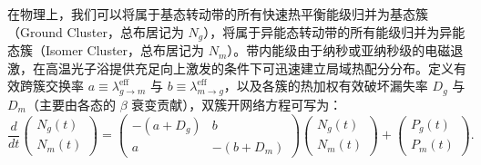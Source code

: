 在物理上，我们可以将属于基态转动带的所有快速热平衡能级归并为基态簇（Ground Cluster，总布居记为 $N_g$），将属于异能态转动带的所有能级归并为异能态簇（Isomer Cluster，总布居记为 $N_m$）。带内能级由于纳秒或亚纳秒级的电磁退激，在高温光子浴提供充足向上激发的条件下可迅速建立局域热配分分布。定义有效跨簇交换率 $a \equiv \lambda_{g \to m}^{\mathrm{eff}}$ 与 $b \equiv \lambda_{m \to g}^{\mathrm{eff}}$，以及各簇的热加权有效破坏漏失率 $D_g$ 与 $D_m$（主要由各态的 $\beta$ 衰变贡献），双簇开网络方程可写为：
\begin{equation}\label{eq:4-8-two-cluster-master}
\frac{d}{dt}\begin{pmatrix} N_g(t) \\ N_m(t) \end{pmatrix} =
\begin{pmatrix} -(a + D_g) & b \\ a & -(b + D_m) \end{pmatrix}
\begin{pmatrix} N_g(t) \\ N_m(t) \end{pmatrix} +
\begin{pmatrix} P_g(t) \\ P_m(t) \end{pmatrix}.
\end{equation}

